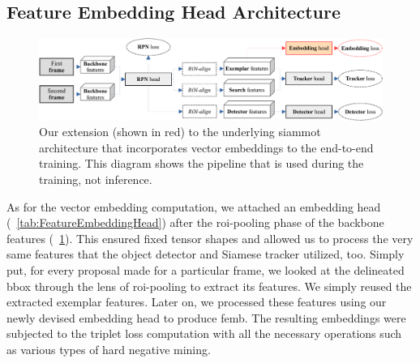 \subsection{Feature Embedding Head Architecture}

\begin{figure}[!t]
    \centering
    \includegraphics[width=\linewidth]{figures/siamese_tracking/siammot_feature_emb_training.pdf}
    \caption[Embedding-enhanced \gls{siammot} architecture]{Our extension (shown in red) to the underlying \gls{siammot} architecture that incorporates vector embeddings to the end-to-end training. This diagram shows the pipeline that is used during the training, not inference.}
    \label{fig:SiamMOTWithEmbeddings}
\end{figure}

As for the vector embedding computation, we attached an embedding head (\tabletext{}~\ref{tab:FeatureEmbeddingHead}) after the \gls{roi}-pooling phase of the backbone features (\figtext{}~\ref{fig:SiamMOTWithEmbeddings}). This ensured fixed tensor shapes and allowed us to process the very same features that the object detector and Siamese tracker utilized, too. Simply put, for every proposal made for a particular frame, we looked at the delineated \gls{bbox} through the lens of \gls{roi}-pooling to extract its features. We simply reused the extracted exemplar features. Later on, we processed these features using our newly devised embedding head to produce \gls{femb}. The resulting embeddings were subjected to the triplet loss computation with all the necessary operations such as various types of hard negative mining.

